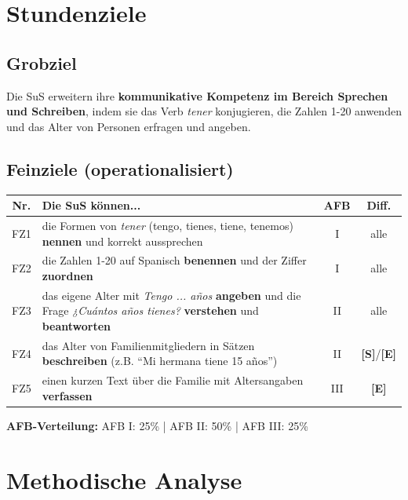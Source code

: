 \documentclass[11pt,a4paper]{article}
\newcommand{\Std}{\textcolor{standard}{\textbf{[S]}}}
\newcommand{\E}{\textcolor{erweiterung}{\textbf{[E]}}}
\begin{document}
\section{Stundenziele}

\subsection{Grobziel}
Die SuS erweitern ihre \textbf{kommunikative Kompetenz im Bereich Sprechen und Schreiben}, indem sie das Verb \textit{tener} konjugieren, die Zahlen 1-20 anwenden und das Alter von Personen erfragen und angeben.

\subsection{Feinziele (operationalisiert)}
\begin{tabular}{|c|p{7.5cm}|c|c|}
\hline
\textbf{Nr.} & \textbf{Die SuS können...} & \textbf{AFB} & \textbf{Diff.} \\
\hline
FZ1 & die Formen von \textit{tener} (tengo, tienes, tiene, tenemos) \textbf{nennen} und korrekt aussprechen & I & alle \\
\hline
FZ2 & die Zahlen 1-20 auf Spanisch \textbf{benennen} und der Ziffer \textbf{zuordnen} & I & alle \\
\hline
FZ3 & das eigene Alter mit \textit{Tengo ... años} \textbf{angeben} und die Frage \textit{¿Cuántos años tienes?} \textbf{verstehen} und \textbf{beantworten} & II & alle \\
\hline
FZ4 & das Alter von Familienmitgliedern in Sätzen \textbf{beschreiben} (z.B. ``Mi hermana tiene 15 años'') & II & \Std{}/\E{} \\
\hline
FZ5 & einen kurzen Text über die Familie mit Altersangaben \textbf{verfassen} & III & \E{} \\
\hline
\end{tabular}

\vspace{1em}
\textbf{AFB-Verteilung:} AFB I: 25\% | AFB II: 50\% | AFB III: 25\%

\section{Methodische Analyse}
\end{document}
